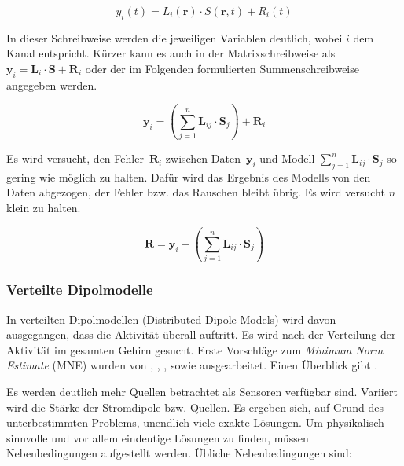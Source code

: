 \documentclass[doc,a4paper,12pt]{apa6}
\newcommand{\mx}[1]{\mathbf{#1}}
\begin{document}
\begin{equation}
\label{eq:leadfield-error}
y_i(t) = L_i(\mx{r}) \cdot S(\mx{r},t) + R_i(t)
\end{equation}

In dieser Schreibweise werden die jeweiligen Variablen deutlich, wobei $i$ dem Kanal entspricht. Kürzer kann es auch in der Matrixschreibweise als $\mx{y}_i = \mx{L}_i \cdot \mx{S} + \mx{R}_i$ oder der im Folgenden formulierten Summenschreibweise angegeben werden.

\begin{equation}
\label{eq:leadfield-error-sum}
\mx{y}_i = \left( \sum_{j=1}^n \mx{L}_{ij} \cdot \mx{S}_j \right) + \mx{R}_i
\end{equation}

Es wird versucht, den Fehler~$\mx{R}_i$ zwischen Daten~$\mx{y}_i$ und Modell $\sum_{j=1}^n \mx{L}_{ij} \cdot \mx{S}_j$ so gering wie möglich zu halten. Dafür wird das Ergebnis des Modells von den Daten abgezogen, der Fehler bzw. das Rauschen bleibt übrig. Es wird versucht $n$ klein zu halten.

\begin{equation}
\mx{R} = \mx{y}_i - \left( \sum_{j=1}^n \mx{L}_{ij} \cdot \mx{S}_j \right)
\end{equation}

\vspace*{5mm}

\subsubsection{Verteilte Dipolmodelle}

In verteilten Dipolmodellen (Distributed Dipole Models) wird davon ausgegangen, dass die Aktivität überall auftritt. Es wird nach der Verteilung der Aktivität im gesamten Gehirn gesucht. Erste Vorschläge zum \emph{Minimum Norm Estimate} (MNE) wurden von \textcite{hamalainen1984interpreting}, \textcite{ilmoniemi1985forward}, \textcite{sarvas1987basic}, sowie \textcite{hamalainen1994interpreting} ausgearbeitet. Einen Überblick gibt \textcite{hamalainen1993magnetoencephalography}.

Es werden deutlich mehr Quellen betrachtet als Sensoren verfügbar sind. Variiert wird die Stärke der Stromdipole bzw. Quellen. Es ergeben sich, auf Grund des unterbestimmten Problems, unendlich viele exakte Lösungen. Um physikalisch sinnvolle und vor allem eindeutige Lösungen zu finden, müssen Nebenbedingungen aufgestellt werden. Übliche Nebenbedingungen sind:
\end{document}
